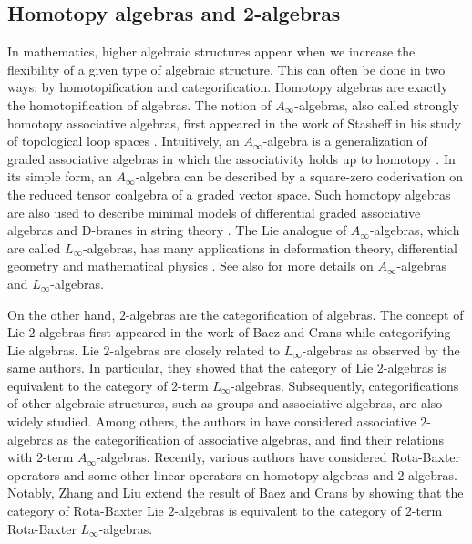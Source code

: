 \documentclass[a4paper,reqno,10pt]{amsart}
\theoremstyle{plain}
\theoremstyle{definition}
\theoremstyle{remark}
\begin{document}
\subsection{Homotopy algebras and 2-algebras} 
In mathematics, higher algebraic structures appear when we increase the flexibility of a given type of algebraic structure. This can often be done in two ways: by homotopification and categorification. Homotopy algebras are exactly the homotopification of algebras. The notion of $A_\infty$-algebras, also called strongly homotopy associative algebras, first appeared in the work of Stasheff in his study of topological loop spaces \cite{stas}. Intuitively, an $A_\infty$-algebra is a generalization of graded associative algebras in which the associativity holds up to homotopy \cite{board}. In its simple form, an $A_\infty$-algebra can be described by a square-zero coderivation on the reduced tensor coalgebra of a graded vector space. Such homotopy algebras are also used to describe minimal models of differential graded associative algebras and D-branes in string theory \cite{keller}. The Lie analogue of $A_\infty$-algebras, which are called $L_\infty$-algebras, has many applications in deformation theory, differential geometry and mathematical physics \cite{marco,sheng-zhu}. See also \cite{keller,loday,lada-markl,lada-s} for more details on $A_\infty$-algebras and $L_\infty$-algebras.

\medskip

On the other hand, $2$-algebras are the categorification of algebras. The concept of Lie $2$-algebras first appeared in the work of Baez and Crans \cite{baez-crans} while categorifying Lie algebras. Lie $2$-algebras are closely related to $L_\infty$-algebras as observed by the same authors. In particular, they showed that the category of Lie $2$-algebras is equivalent to the category of $2$-term $L_\infty$-algebras. Subsequently, categorifications of other algebraic structures, such as groups and associative algebras, are also widely studied. Among others, the authors in \cite{das-hom,kh} have considered associative $2$-algebras as the categorification of associative algebras, and find their relations with $2$-term $A_\infty$-algebras. Recently, various authors have considered Rota-Baxter operators and some other linear operators on homotopy algebras and $2$-algebras. Notably, Zhang and Liu \cite{zhang-liu} extend the result of Baez and Crans by showing that the category of Rota-Baxter Lie $2$-algebras is equivalent to the category of $2$-term Rota-Baxter $L_\infty$-algebras.
\end{document}
